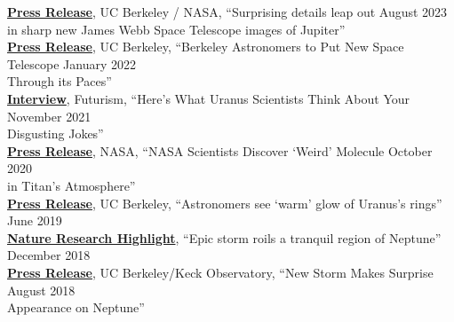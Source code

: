 \documentclass[margin, 10pt]{res} %
\newcommand\tab[1][1cm]{\hspace*{#1}}
\begin{document}
\begin{resume}


\href{https://news.berkeley.edu/2022/08/22/surprising-details-leap-out-in-sharp-new-james-webb-space-telescope-images-of-jupiter}{{\bf Press Release}}, UC Berkeley / NASA, ``Surprising details leap out \hfill August 2023 \\
\tab in sharp new James Webb Space Telescope images of Jupiter'' \\
\href{https://news.berkeley.edu/2022/01/25/berkeley-astronomers-to-put-new-space-telescope-through-its-paces/}{{\bf Press Release}}, UC Berkeley, ``Berkeley Astronomers to Put New Space Telescope \hfill January 2022 \\
\tab Through its Paces'' \\
\href{https://futurism.com/scientists-gross-uranus-jokes}{{\bf Interview}}, Futurism, ``Here's What Uranus Scientists Think About Your  \hfill November 2021 \\
\tab Disgusting Jokes''  \\
\href{https://www.nasa.gov/feature/goddard/2020/nasa-scientists-discover-a-weird-molecule-in-titan-s-atmosphere}{{\bf Press Release}}, NASA, ``NASA Scientists Discover `Weird' Molecule \hfill October 2020 \\
\tab in Titan's Atmosphere''  \\
\href{https://news.berkeley.edu/2019/06/20/astronomers-see-warm-glow-of-uranuss-rings/}{{\bf Press Release}}, UC Berkeley, ``Astronomers see `warm' glow of Uranus's rings'' \hfill June 2019 \\ 
\href{https://www.nature.com/articles/d41586-018-07622-4}{{\bf Nature Research Highlight}}, ``Epic storm roils a tranquil region of Neptune'' \hfill December 2018 \\
\href{http://www.keckobservatory.org/new_storm_makes_surprise_appearance_on_neptune/}{{\bf Press Release}}, UC Berkeley/Keck Observatory, ``New Storm Makes Surprise \hfill August 2018 \\
	\tab Appearance on Neptune'' \\ %



\end{resume}
\end{document}
